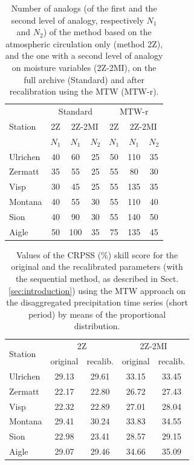 \documentclass[hess, manuscript]{copernicus}
\begin{document}
\begin{table}[htb]
	\caption{Number of analogs (of the first and the second level of analogy, respectively $N_{1}$ and $N_{2}$) of the method based on the atmospheric circulation only (method 2Z), and the one with a second level of analogy on moisture variables (2Z-2MI), on the full archive (Standard) and after recalibration using the MTW (MTW-r).}
	\begin{center}
		\begin{tabular}{l c c c c c c }
			\hline
			\multirow{3}{*}{Station} & \multicolumn{3}{c}{Standard} & \multicolumn{3}{c}{MTW-r} \\
			& 2Z & \multicolumn{2}{c}{2Z-2MI} & 2Z & \multicolumn{2}{c}{2Z-2MI}\\
			& $N_{1}$ & $N_{1}$ & $N_{2}$ & $N_{1}$ & $N_{1}$ & $N_{2}$\\ 
			\hline
			Ulrichen & 40 & 60 & 25 & 50 & 110 & 35\\
			Zermatt & 35 & 55 & 25 & 55 & 80 & 30\\
			Visp & 30 & 45 & 25 & 55 & 135 & 35\\
			Montana & 40 & 55 & 30 & 55 & 110 & 40\\
			Sion & 40 & 90 & 30 & 55 & 140 & 50\\
			Aigle & 50 & 100 & 35 & 75 & 135 & 45\\ 
			\hline
		\end{tabular}
	\end{center}	
	\label{table:analog_nb}
\end{table}

\begin{table}[htb]
	\caption{Values of the CRPSS (\%) skill score for the original and the recalibrated parameters (with the sequential method, as described in Sect. \ref{sec:introduction}) using the MTW approach on the disaggregated precipitation time series (short period) by means of the proportional distribution.}
	\begin{center}
		\begin{tabular}{l c c c c}
			\hline
			\multirow{2}{*}{Station} & \multicolumn{2}{c}{2Z} & \multicolumn{ 2}{c}{2Z-2MI} \\
			& original & recalib. & original & recalib. \\
			\hline
			Ulrichen & 29.13 & 29.61 & 33.15 & 33.45 \\
			Zermatt & 22.17 & 22.80 & 26.72 & 27.43 \\
			Visp & 22.32 & 22.89 & 27.01 & 28.04 \\
			Montana & 29.41 & 30.24 & 33.83 & 34.55 \\
			Sion & 22.98 & 23.41 & 28.57 & 29.15 \\
			Aigle & 29.07 & 29.46 & 34.66 & 35.09 \\
			\hline
		\end{tabular}
	\end{center}
	\label{table:disaggregation_proportional}
\end{table}
\end{document}
